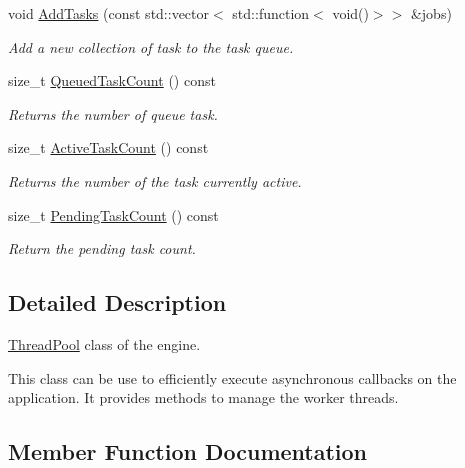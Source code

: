 \begin{DoxyCompactItemize}
void \hyperlink{class_blade_1_1_thread_pool_acacbc26ec4bf163a12b5005c3d1fd0c5}{Add\+Tasks} (const std\+::vector$<$ std\+::function$<$ void()$>$$>$ \&jobs)
\begin{DoxyCompactList}\small\item\em Add a new collection of task to the task queue. \end{DoxyCompactList}\item 
size\+\_\+t \hyperlink{class_blade_1_1_thread_pool_a30124532ff2e5e72c1d03ae9f6029b91}{Queued\+Task\+Count} () const
\begin{DoxyCompactList}\small\item\em Returns the number of queue task. \end{DoxyCompactList}\item 
size\+\_\+t \hyperlink{class_blade_1_1_thread_pool_a0f046b3e1be7b85ef0a21f94c2380aa8}{Active\+Task\+Count} () const
\begin{DoxyCompactList}\small\item\em Returns the number of the task currently active. \end{DoxyCompactList}\item 
size\+\_\+t \hyperlink{class_blade_1_1_thread_pool_af24597a7aa14bc296735f9f2d7d460df}{Pending\+Task\+Count} () const
\begin{DoxyCompactList}\small\item\em Return the pending task count. \end{DoxyCompactList}\end{DoxyCompactItemize}


\subsection{Detailed Description}
\hyperlink{class_blade_1_1_thread_pool}{Thread\+Pool} class of the engine. 

This class can be use to efficiently execute asynchronous callbacks on the application. It provides methods to manage the worker threads. 

\subsection{Member Function Documentation}
\mbox{\label{class_blade_1_1_thread_pool_a0f046b3e1be7b85ef0a21f94c2380aa8}} 
